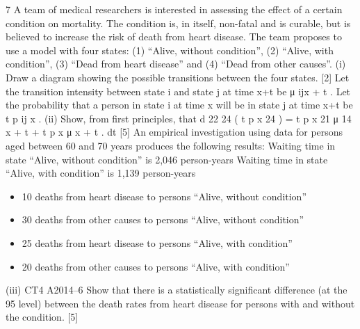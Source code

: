 \documentclass[a4paper,12pt]{article}
\begin{document}
\begin{enumerate}
7
A team of medical researchers is interested in assessing the effect of a certain
condition on mortality. The condition is, in itself, non-fatal and is curable, but is
believed to increase the risk of death from heart disease. The team proposes to use a
model with four states: (1) “Alive, without condition”, (2) “Alive, with condition”,
(3) “Dead from heart disease” and (4) “Dead from other causes”.
(i)
Draw a diagram showing the possible transitions between the four states.
[2]
Let the transition intensity between state i and state j at time x+t be μ ijx + t . Let the
probability that a person in state i at time x will be in state j at time x+t be t p ij x .
(ii)
Show, from first principles, that
d
22 24
( t p x 24 ) = t p x 21 μ 14
x + t + t p x μ x + t .
dt
[5]
An empirical investigation using data for persons aged between 60 and 70 years produces the following results:
Waiting time in state “Alive, without condition” is 2,046 person-years
Waiting time in state “Alive, with condition” is 1,139 person-years
\begin{itemize}
\item 10 deaths from heart disease to persons “Alive, without condition”
\item 30 deaths from other causes to persons “Alive, without condition”
\item 25 deaths from heart disease to persons “Alive, with condition”
\item 20 deaths from other causes to persons “Alive, with condition”
\end{itemize}

(iii)
CT4 A2014–6
Show that there is a statistically significant difference (at the 95%
level) between the death rates from heart disease for persons with and without
the condition.
[5]


\end{enumerate}
\end{document}
